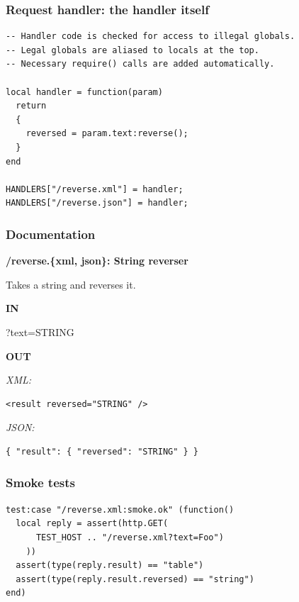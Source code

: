 \documentclass[handout]{beamer}
\begin{document}

\begin{frame}[fragile]

\frametitle{Request handler: the handler itself}

\begin{verbatim}
-- Handler code is checked for access to illegal globals.
-- Legal globals are aliased to locals at the top.
-- Necessary require() calls are added automatically.

local handler = function(param)
  return
  {
    reversed = param.text:reverse();
  }
end

HANDLERS["/reverse.xml"] = handler;
HANDLERS["/reverse.json"] = handler;
\end{verbatim}

\end{frame}


\begin{frame}[fragile]

\frametitle{Documentation}
\large{\textbf{/reverse.\{xml, json\}: String reverser}}

Takes a string and reverses it.

\textbf{IN}
\begin{semiverbatim}
  ?text=STRING
\end{semiverbatim}

\textbf{OUT}

\textit{XML:}

\begin{verbatim}
<result reversed="STRING" />
\end{verbatim}

\textit{JSON:}

\begin{verbatim}
{ "result": { "reversed": "STRING" } }
\end{verbatim}

\end{frame}


\begin{frame}[fragile]

\frametitle{Smoke tests}

\begin{verbatim}
test:case "/reverse.xml:smoke.ok" (function()
  local reply = assert(http.GET(
      TEST_HOST .. "/reverse.xml?text=Foo")
    ))
  assert(type(reply.result) == "table")
  assert(type(reply.result.reversed) == "string")
end)
\end{verbatim}

\end{frame}
\end{document}
